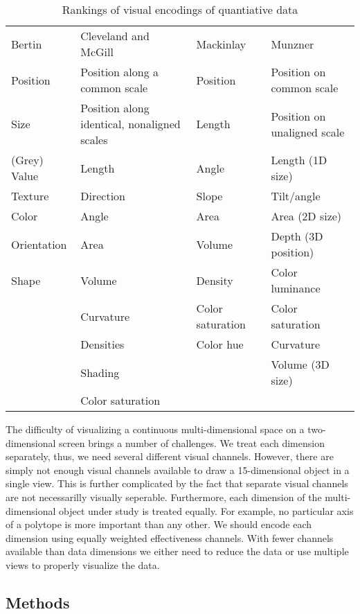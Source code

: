 \begin{table}
  \caption{Rankings of visual encodings of quantiative data}
  \label{tbl:visual_encodings}
  \begin{adjustbox}{max width=\linewidth}
  \begin{tabular}{llll}
    Bertin~\cite{Bertin:1967} & Cleveland and McGill~\cite{Cleveland:1984} & Mackinlay~\cite{Mackinlay:1986} & Munzner~\cite{Munzner:2014} \\
     Position & Position along a common scale & Position & Position on common scale \\
     Size & Position along identical, nonaligned scales & Length & Position on unaligned scale \\
     (Grey) Value & Length & Angle & Length (1D size) \\
     Texture & Direction & Slope & Tilt/angle \\
     Color & Angle & Area & Area (2D size) \\
     Orientation & Area & Volume & Depth (3D position) \\
     Shape & Volume & Density & Color luminance\\
     & Curvature & Color saturation & Color saturation \\
     & Densities & Color hue & Curvature \\
     & Shading & & Volume (3D size) \\
     & Color saturation &           & 
  \end{tabular}
  \end{adjustbox}
\end{table}

The difficulty of visualizing a continuous multi-dimensional space on a
two-dimensional screen brings a number of challenges. We treat each dimension
separately, thus, we need several different visual channels. However, there are
simply not enough visual channels available to draw a 15-dimensional object in
a single view. This is further complicated by the fact that separate visual
channels are not necessarilly visually seperable.  Furthermore, each dimension
of the multi-dimensional object under study is treated equally. For example, no
particular axis of a polytope is more important than any other.  We should
encode each dimension using equally weighted effectiveness channels.  With
fewer channels available than data dimensions we either need to reduce the data
or use multiple views to properly visualize the data.


\subsection{Methods}

